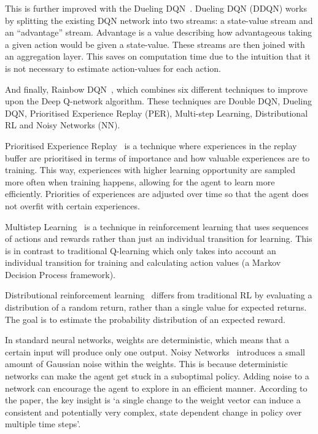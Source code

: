\documentclass[12pt,a4paper]{article}
\begin{document}
    This is further improved with the Dueling DQN~\citep{wang16}.
    Dueling DQN (DDQN) works by splitting the existing DQN network into two streams: a state-value stream and an ``advantage'' stream.
    Advantage is a value describing how advantageous taking a given action would be given a state-value.
    These streams are then joined with an aggregation layer.
    This saves on computation time due to the intuition that it is not necessary to estimate action-values for each action.

    And finally, Rainbow DQN~\citep{hessel17}, which combines six different techniques to improve upon the Deep Q-network algorithm.
    These techniques are Double DQN, Dueling DQN, Prioritised Experience Replay (PER),
    Multi-step Learning, Distributional RL and Noisy Networks (NN).

    Prioritised Experience Replay~\citep{schaul16} is a technique where experiences in the replay buffer are prioritised in terms of importance and how valuable experiences are to training.
    This way, experiences with higher learning opportunity are sampled more often when training happens, allowing for the agent to learn more efficiently.
    Priorities of experiences are adjusted over time so that the agent does not overfit with certain experiences.

    Multistep Learning~\citep[chap.~7.1]{sutton18} is a technique in reinforcement learning that uses sequences of actions and rewards rather than just an individual transition for learning.
    This is in contrast to traditional Q-learning which only takes into account an individual transition for training and calculating action values (a Markov Decision Process framework).

    Distributional reinforcement learning~\citep{bellemare17} differs from traditional RL by evaluating a distribution of a random return, rather than a single value for expected returns.
    The goal is to estimate the probability distribution of an expected reward.

    In standard neural networks, weights are deterministic, which means that a certain input will produce only one output.
    Noisy Networks~\citep{fortunato19} introduces a small amount of Gaussian noise within the weights.
    This is because deterministic networks can make the agent get stuck in a suboptimal policy.
    Adding noise to a network can encourage the agent to explore in an efficient manner.
    According to the paper, the key insight is `a single change to the weight vector can induce a consistent and potentially very complex, state dependent change in policy over multiple time steps'.
\end{document}
